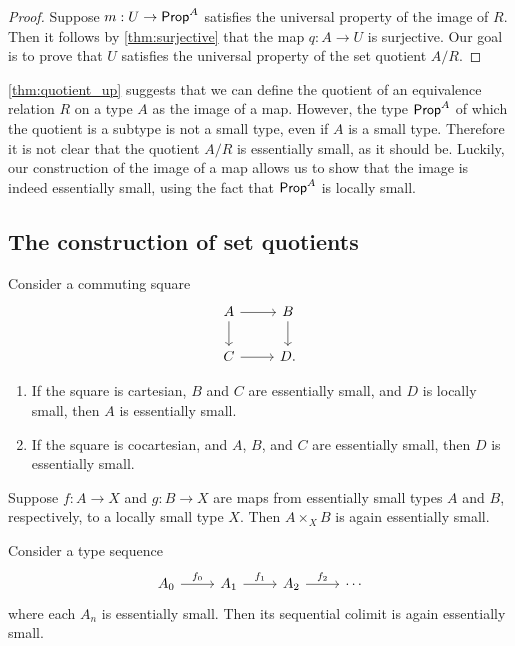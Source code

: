 \begin{proof}
Suppose $m:U\to \mathsf{Prop}^A$ satisfies the universal property of the image of $R$. Then it follows by \cref{thm:surjective} that the map $q:A\to U$ is surjective. Our goal is to prove that $U$ satisfies the universal property of the set quotient $A/R$. 
\end{proof}

\begin{rmk}
\cref{thm:quotient_up} suggests that we can define the quotient of an equivalence relation $R$ on a type $A$ as the image of a map. However, the type $\mathsf{Prop}^A$ of which the quotient is a subtype is not a small type, even if $A$ is a small type.
Therefore it is not clear that the quotient $A/R$ is essentially small, as it should be. Luckily, our construction of the image of a map allows us to show that the image is indeed essentially small, using the fact that $\mathsf{Prop}^A$ is locally small.
\end{rmk}

\subsection{The construction of set quotients}
\begin{lem}
Consider a commuting square
\begin{equation*}
\begin{tikzcd}
A \arrow[r] \arrow[d] & B \arrow[d] \\
C \arrow[r] & D.
\end{tikzcd}
\end{equation*}
\begin{enumerate}
\item If the square is cartesian, $B$ and $C$ are essentially small, and $D$ is locally small, then $A$ is essentially small.
\item If the square is cocartesian, and $A$, $B$, and $C$ are essentially small, then $D$ is essentially small. 
\end{enumerate}
\end{lem}

\begin{cor}
Suppose $f:A\to X$ and $g:B\to X$ are maps from essentially small types $A$ and $B$, respectively, to a locally small type $X$. Then $A\times_X B$ is again essentially small. 
\end{cor}

\begin{lem}
Consider a type sequence
\begin{equation*}
\begin{tikzcd}
A_0 \arrow[r,"f_0"] & A_1 \arrow[r,"f_1"] & A_2 \arrow[r,"f_2"] & \cdots
\end{tikzcd}
\end{equation*}
where each $A_n$ is essentially small. Then its sequential colimit is again essentially small. 
\end{lem}

